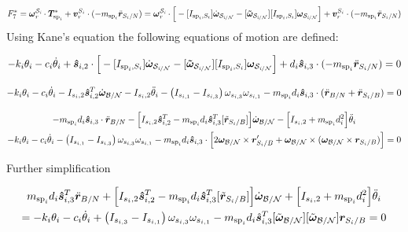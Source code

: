 \documentclass[paper]{aiaaNew}
\begin{document}
\begin{equation}
F^*_{7} = \bm \omega_{\textit{r}}^{\cal{S}_\textit{i}} \cdot \bm T^*_{\text{sp}_i}  + \bm v^{S_i}_{r} \cdot (-m_{\text{sp}_i} \ddot{\bm r}_{S_{i}/N}) = \bm \omega_{\textit{r}}^{\cal{S}_\textit{i}} \cdot \Big[-[I_{\text{sp}_i,S_i}] \dot{\bm\omega}_{\cal S_{\textit{i}/N}}  -[\bm{\tilde{\omega}}_{\cal S_{\textit{i}/N}}] [I_{\text{sp}_i,S_i}] \bm\omega_{\cal S_{\textit{i}/N}} \Big] + \bm v^{S_i}_{r} \cdot (-m_{\text{sp}_i} \ddot{\bm r}_{S_{i}/N})
\end{equation}
Using Kane's equation the following equations of motion are defined:

\begin{equation}
-k_i \theta_i - c_i \dot{\theta}_i + \bm{\hat{s}}_{i,2} \cdot \Big[-[I_{\text{sp}_i,S_i}] \dot{\bm\omega}_{\cal S_{\textit{i}/N}}  -[\bm{\tilde{\omega}}_{\cal S_{\textit{i}/N}}] [I_{\text{sp}_i,S_i}] \bm\omega_{\cal S_{\textit{i}/N}} \Big] + d_i \bm{\hat{s}}_{i,3} \cdot (-m_{\text{sp}_i} \ddot{\bm r}_{S_{i}/N}) = 0
\end{equation}

\begin{equation}
-k_i \theta_i - c_i \dot{\theta}_i - I_{s_i,2} \bm{\hat{s}}_{i,2}^T \dot{\bm\omega}_{\cal B/N} - I_{s_i,2} \ddot{\theta}_i - \left( I_{s_{i,1}} - I_{s_{i,3}}\right) \omega_{s_{i,3}} \omega_{s_{i,1}} - m_{\text{sp}_i} d_i \bm{\hat{s}}_{i,3} \cdot (\ddot{\bm r}_{B/N} + \ddot{\bm r}_{S_{i}/B}) = 0
\end{equation}

\begin{multline}
- m_{\text{sp}_i} d_i \bm{\hat{s}}_{i,3} \cdot \ddot{\bm r}_{B/N} - \Big[I_{s_i,2} \bm{\hat{s}}_{i,2}^T - m_{\text{sp}_i} d_i \bm{\hat{s}}_{i,3}^T [\tilde{\bm{r}}_{S_i/B}] \Big] \dot{\bm\omega}_{\cal B/N} - \Big[I_{s_i,2} + m_{\text{sp}_i} d_i^2 \Big] \ddot{\theta}_i \\
-k_i \theta_i - c_i \dot{\theta}_i - \left( I_{s_{i,1}} - I_{s_{i,3}}\right) \omega_{s_{i,3}} \omega_{s_{i,1}} - m_{\text{sp}_i} d_i \bm{\hat{s}}_{i,3} \cdot \Big[ 
2 \bm\omega_{\cal B/N} \times \bm{r}'_{S_i/B}
+ \bm\omega_{\cal B/N} \times (\bm\omega_{\cal B/N} \times \bm{r}_{S_i/B})\Big] = 0
\end{multline}

Further simplification

\begin{multline}
m_{\text{sp}_i} d_i \bm{\hat{s}}_{i,3}^T \ddot{\bm r}_{B/N} + \Big[I_{s_i,2} \bm{\hat{s}}_{i,2}^T - m_{\text{sp}_i} d_i \bm{\hat{s}}_{i,3}^T [\tilde{\bm{r}}_{S_i/B}] \Big] \dot{\bm\omega}_{\cal B/N} + \Big[I_{s_i,2} + m_{\text{sp}_i} d_i^2 \Big] \ddot{\theta}_i \\
= -k_i \theta_i - c_i \dot{\theta}_i + \left(I_{s_{i,3}} - I_{s_{i,1}} \right) \omega_{s_{i,3}} \omega_{s_{i,1}} - m_{\text{sp}_i} d_i \hat{\bm s}_{i,3}^{T} [\tilde{\bm\omega}_{\cal B/N}][\tilde{\bm\omega}_{\cal B/N}] \bm r_{S_i/B}  = 0
\end{multline}
\end{document}
